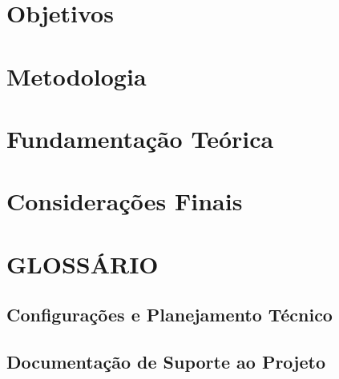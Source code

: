 \documentclass[
	10pt,				%
	openany,
    twoside,			%
	a4paper,			%
    chapter={TITLE},
    section={TITLE},
    subsection={TITLE},
    subsubsection={TITLE},
	english,			%
	french,				%
	spanish,			%
	brazil,				%
	sumario=tradicional
]{abntex2}
\begin{document}
\chapter{Objetivos}
    

\chapter{Metodologia}
    

\chapter{Fundamentação Teórica}
    

\chapter{Considerações Finais}
    

\postextual



\nocite{attili:24, abdulhussein:20, dockens:18, jain:24, li:22, wang:24,
        lobo-neto:24, kamble:25, varshini:25, lia:25, myagila:25,
        navendu:24, velmathi:23, silva-libras:25, gueuwou:25, grossi:24,
        perdigoto:24, silva-embarcado:24, anithadevi:25, oudah:20, sahoo:19,
        islam:19, saud:25, maia:25, costa-i3d:25, costa-slr:25, sousa:25,
        silva-ia:25, silva-conexao:24, alves:24, fanucchi:24, hamidullah:25,
        mdpi:25, scitepress:25}



\newpage
    \chapter*{GLOSSÁRIO}
    

\begin{apendicesenv}
\chapter{Configurações e Planejamento Técnico}
    
\end{apendicesenv}

\begin{anexosenv}
\chapter{Documentação de Suporte ao Projeto}
    
\end{anexosenv}
\end{document}
